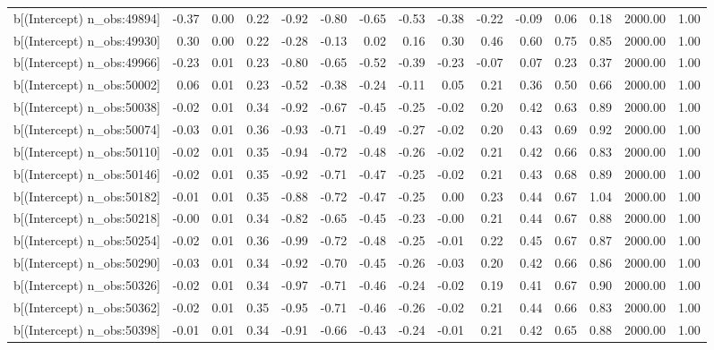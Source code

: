 \begin{table}[ht]
\begin{tabular}{rrrrrrrrrrrrrrr}
  b[(Intercept) n\_obs:49894] & -0.37 & 0.00 & 0.22 & -0.92 & -0.80 & -0.65 & -0.53 & -0.38 & -0.22 & -0.09 & 0.06 & 0.18 & 2000.00 & 1.00 \\ 
  b[(Intercept) n\_obs:49930] & 0.30 & 0.00 & 0.22 & -0.28 & -0.13 & 0.02 & 0.16 & 0.30 & 0.46 & 0.60 & 0.75 & 0.85 & 2000.00 & 1.00 \\ 
  b[(Intercept) n\_obs:49966] & -0.23 & 0.01 & 0.23 & -0.80 & -0.65 & -0.52 & -0.39 & -0.23 & -0.07 & 0.07 & 0.23 & 0.37 & 2000.00 & 1.00 \\ 
  b[(Intercept) n\_obs:50002] & 0.06 & 0.01 & 0.23 & -0.52 & -0.38 & -0.24 & -0.11 & 0.05 & 0.21 & 0.36 & 0.50 & 0.66 & 2000.00 & 1.00 \\ 
  b[(Intercept) n\_obs:50038] & -0.02 & 0.01 & 0.34 & -0.92 & -0.67 & -0.45 & -0.25 & -0.02 & 0.20 & 0.42 & 0.63 & 0.89 & 2000.00 & 1.00 \\ 
  b[(Intercept) n\_obs:50074] & -0.03 & 0.01 & 0.36 & -0.93 & -0.71 & -0.49 & -0.27 & -0.02 & 0.20 & 0.43 & 0.69 & 0.92 & 2000.00 & 1.00 \\ 
  b[(Intercept) n\_obs:50110] & -0.02 & 0.01 & 0.35 & -0.94 & -0.72 & -0.48 & -0.26 & -0.02 & 0.21 & 0.42 & 0.66 & 0.83 & 2000.00 & 1.00 \\ 
  b[(Intercept) n\_obs:50146] & -0.02 & 0.01 & 0.35 & -0.92 & -0.71 & -0.47 & -0.25 & -0.02 & 0.21 & 0.43 & 0.68 & 0.89 & 2000.00 & 1.00 \\ 
  b[(Intercept) n\_obs:50182] & -0.01 & 0.01 & 0.35 & -0.88 & -0.72 & -0.47 & -0.25 & 0.00 & 0.23 & 0.44 & 0.67 & 1.04 & 2000.00 & 1.00 \\ 
  b[(Intercept) n\_obs:50218] & -0.00 & 0.01 & 0.34 & -0.82 & -0.65 & -0.45 & -0.23 & -0.00 & 0.21 & 0.44 & 0.67 & 0.88 & 2000.00 & 1.00 \\ 
  b[(Intercept) n\_obs:50254] & -0.02 & 0.01 & 0.36 & -0.99 & -0.72 & -0.48 & -0.25 & -0.01 & 0.22 & 0.45 & 0.67 & 0.87 & 2000.00 & 1.00 \\ 
  b[(Intercept) n\_obs:50290] & -0.03 & 0.01 & 0.34 & -0.92 & -0.70 & -0.45 & -0.26 & -0.03 & 0.20 & 0.42 & 0.66 & 0.86 & 2000.00 & 1.00 \\ 
  b[(Intercept) n\_obs:50326] & -0.02 & 0.01 & 0.34 & -0.97 & -0.71 & -0.46 & -0.24 & -0.02 & 0.19 & 0.41 & 0.67 & 0.90 & 2000.00 & 1.00 \\ 
  b[(Intercept) n\_obs:50362] & -0.02 & 0.01 & 0.35 & -0.95 & -0.71 & -0.46 & -0.26 & -0.02 & 0.21 & 0.44 & 0.66 & 0.83 & 2000.00 & 1.00 \\ 
  b[(Intercept) n\_obs:50398] & -0.01 & 0.01 & 0.34 & -0.91 & -0.66 & -0.43 & -0.24 & -0.01 & 0.21 & 0.42 & 0.65 & 0.88 & 2000.00 & 1.00 \\ 

\end{tabular}
\end{table}
